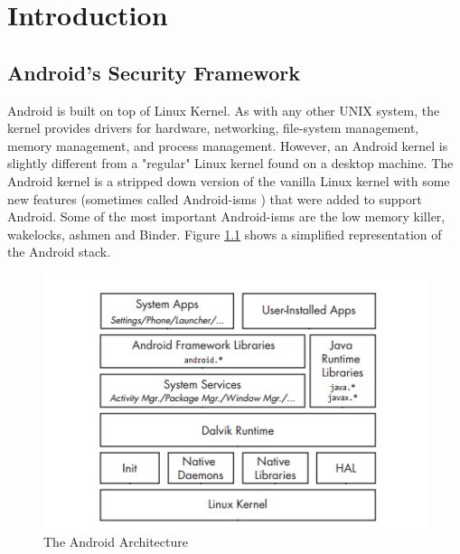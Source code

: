 \chapter{Introduction}

\section{Android's Security Framework}
Android is built on top of Linux Kernel. As with any other UNIX system, the kernel provides drivers for hardware, networking, file-system management, memory management, and process management. However, an Android kernel is slightly different from a "regular" Linux kernel found on a desktop machine. The Android kernel is a stripped down version of the vanilla Linux kernel with some new features (sometimes called Android-isms \cite{yaghmour2013embedded}) that were added to support Android. Some of the most important Android-isms are the low memory killer, wakelocks, ashmen and Binder. Figure \ref{fig:architecture} shows a simplified representation of the Android stack.

\begin{figure}[htb]
\centering
\includegraphics[scale=0.8]{android_architecture.png} %
\caption{The Android Architecture\cite{Mgr}}
\label{fig:architecture} %
\end{figure}

